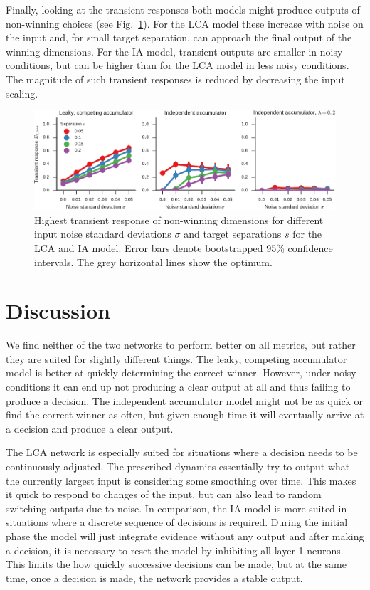 \documentclass[10pt,letterpaper]{article}
\begin{document}
Finally, looking at the transient responses both models might produce outputs of 
non-winning choices (see Fig.~\ref{fig:transient}). For the LCA model these 
increase with noise on the input and, for small target separation, can approach 
the final output of the winning dimensions. For the IA model, transient outputs 
are smaller in noisy conditions, but can be higher than for the LCA model in 
less noisy conditions.  The magnitude of such transient responses is reduced by 
decreasing the input scaling.
\begin{figure}
    \centering
    \includegraphics{figures/transient}
    \caption{Highest transient response of non-winning dimensions for different 
        input noise standard deviations $\sigma$ and target separations $s$ for 
        the LCA and IA model. Error bars denote bootstrapped 95\% confidence 
        intervals. The grey horizontal lines show the 
        optimum.}\label{fig:transient}
\end{figure}

\section{Discussion}
We find neither of the two networks to perform better on all metrics, but rather 
they are suited for slightly different things. The leaky, competing accumulator 
model is better at quickly determining the correct winner. However, under noisy 
conditions it can end up not producing a clear output at all and thus failing to 
produce a decision.  The independent accumulator model might not be as quick or 
find the correct winner as often, but given enough time it will eventually 
arrive at a decision and produce a clear output.

The LCA network is especially suited for situations where a decision needs to be 
continuously adjusted. The prescribed dynamics essentially try to output what 
the currently largest input is considering some smoothing over time. This makes 
it quick to respond to changes of the input, but can also lead to random 
switching outputs due to noise. In comparison, the IA model is more suited in 
situations where a discrete sequence of decisions is required.  During the 
initial phase the model will just integrate evidence without any output and 
after making a decision, it is necessary to reset the model by inhibiting all 
layer 1 neurons. This limits the how quickly successive decisions can be made, 
but at the same time, once a decision is made, the network provides a stable 
output.
\end{document}
